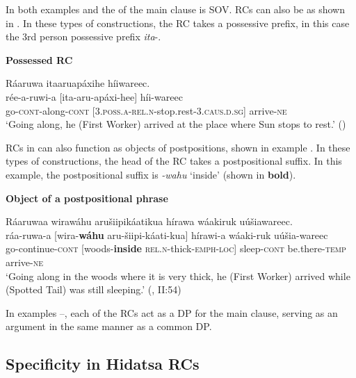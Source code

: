 \documentclass[output=paper]{LSP/langsci}
\begin{document}
In both examples  and  the  of the main clause is SOV. RCs can also be  as shown in . In these types of constructions, the  RC takes a possessive prefix, in this case the 3rd person possessive prefix \textit{ita}-.

\ea \textbf{Possessed RC} \label{boyle4}

\glll Ráaruwa  {\ob}itaaruapáxihe{\cb}   h\'iiwareec.\\
rée-a-ruwi-a  [ita-aru-apáxi-hee] h\'ii-wareec\\
go-\textsc{cont}-along-\textsc{cont} [\textsc{3.poss.a-rel.n}-stop.rest-\textsc{3.caus.d.sg}] arrive-\textsc{ne}\\
\trans `Going along, he (First Worker) arrived at the place where Sun stops to rest.' (\citealt[I: 21]{Lowie1939})
\z

RCs in  can also function as objects of postpositions, shown in example . In these types of constructions, the head of the RC takes a postpositional suffix. In this example, the postpositional suffix is \textit{-wahu} `inside' (shown in \textbf{bold}). 

\ea \textbf{Object of a postpositional phrase} \label{boyle5}

\glll Ráaruwaa   {\ob}wirawáhu  aru\v{s}iipikáatikua{\cb}   h\'irawa wáakiruk u\'u\v{s}iawareec.\\
ráa-ruwa-a [wira-\textbf{wáhu} aru-\v{s}iipi-káati-kua] h\'irawi-a wáaki-ruk u\'u\v{s}ia-wareec\\     
go-continue-\textsc{cont} [woods-\textbf{inside}  \textsc{rel.n}-thick-\textsc{emph-loc}] sleep-\textsc{cont} be.there-\textsc{temp} arrive-\textsc{ne}\\
\trans `Going along in the woods where it is very thick, he (First Worker) arrived while (Spotted Tail) was still sleeping.' (\citealt{Lowie1939}, II:54)
\z

\newpage
In examples --, each of the RCs act as a DP for the main clause, serving as an argument in the same manner as a common DP.

\subsection{Specificity in {Hidatsa} RCs}\label{sec:boyle:2.2}
\end{document}
